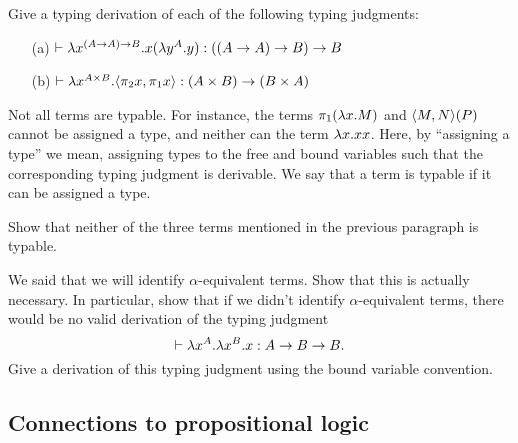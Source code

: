 \documentclass{article}
\begin{document}
\begin{exercise}
  Give a typing derivation of each of the following typing judgments:
  \begin{enumerate}
  \item[(a)] $\vdash\lambda x^{(A\to A)\to B}.x(\lambda y^{A}.y):((A\to
    A)\to B)\to B$
  \item[(b)] $\vdash\lambda x^{A\times B}.\langle\pi_2 x,\pi_1
      x\rangle:(A\times B)\to (B\times A)$
  \end{enumerate}
\end{exercise}

Not all terms are typable. For instance, the terms $\pi_1(\lambda x.M)$
and $\langle M,N\rangle(P)$ cannot be assigned a type, and neither can the
term $\lambda x.xx$. Here, by ``assigning a type'' we mean, assigning
types to the free and bound variables such that the corresponding
typing judgment is derivable. We say that a term is typable if it can
be assigned a type.

\begin{exercise}
  Show that neither of the three terms mentioned in the previous paragraph
  is typable. 
\end{exercise}

\begin{exercise}
  We said that we will identify $\alpha$-equivalent terms. Show that
  this is actually necessary. In particular, show that if we didn't
  identify $\alpha$-equivalent terms, there would be no valid
  derivation of the typing judgment
  \[ \vdash\lambda x^{A}.\lambda x^{B}.x:A\to B\to B. \]
  Give a derivation of this typing judgment using the bound variable
  convention.
\end{exercise}

\subsection{Connections to propositional logic}
\label{subsec-connprop}
\end{document}
